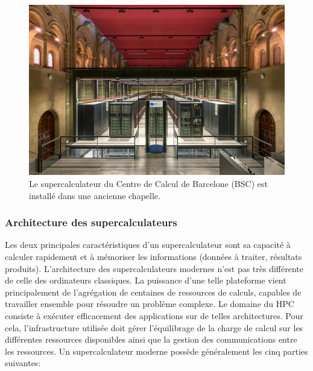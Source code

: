         
        \begin{figure}
        \center
        \includegraphics[width=12cm]{images/hpc_bsc_super.jpg}
        \caption{\label{fig:hpc_bsc_super} Le supercalculateur du Centre de Calcul de Barcelone (BSC) est installé dans une ancienne chapelle.}
        \end{figure}
        
        
    
        
    \subsubsection{Architecture des supercalculateurs}
    
        Les deux principales caractéristiques d'un supercalculateur sont sa capacité à calculer rapidement et à mémoriser les informations (données à traiter, résultats produits). L'architecture des supercalculateurs modernes n'est pas très différente de celle des ordinateurs classiques. La puissance d'une telle plateforme vient principalement de l'agrégation de centaines de ressources de calculs, capables de travailler ensemble pour résoudre un problème complexe. Le domaine du HPC consiste à exécuter efficacement des applications sur de telles architectures. Pour cela, l'infrastructure utilisée doit gérer l'équilibrage de la charge de calcul sur les différentes ressources disponibles ainsi que la gestion des communications entre les ressources. Un supercalculateur moderne possède généralement les cinq parties suivantes:
      
